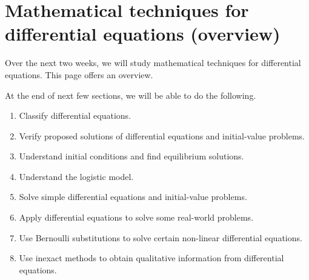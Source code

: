 \documentclass[./main.tex]{subfiles}
\begin{document}
 \section{Mathematical techniques for differential equations (overview)}

Over the next two weeks, we will study mathematical techniques for differential equations. This page offers an overview. 

At the end of next few sections, we will be able to do the following.
\begin{enumerate}
  \item Classify differential equations.
  \item Verify proposed solutions of differential equations and initial-value problems.
  \item Understand initial conditions and find equilibrium solutions. 
  \item Understand the logistic model.
  \item Solve simple differential equations and initial-value problems.
  \item Apply differential equations to solve some real-world problems.
  \item Use Bernoulli substitutions to solve certain non-linear differential equations.
  \item Use inexact methods to obtain qualitative information from differential equations.
\end{enumerate}
\end{document}

